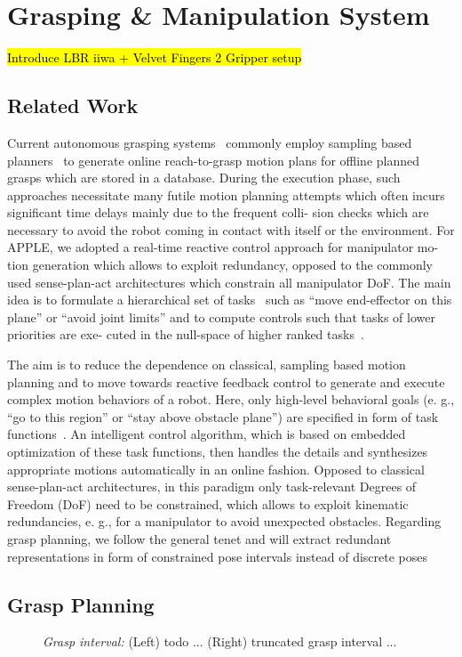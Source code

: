 \section{Grasping \& Manipulation System}
\label{sec:manip}
%
\hl{Introduce LBR iiwa + Velvet Fingers 2 Gripper setup}
%
\subsection{Related Work}
\label{subsec:Grasping_related_work}
%
 Current autonomous grasping systems~\cite{Bere07, Srin10, Krug14a}
commonly employ sampling based planners~\cite{LaVa06} to generate online reach-to-grasp motion plans
for offline planned grasps which are stored in a database. During the execution phase, such
approaches necessitate many futile motion planning attempts which often incurs significant time
delays mainly due to the frequent colli- sion checks which are necessary to avoid the robot coming
in contact with itself or the environment.  For APPLE, we adopted a real-time reactive control
approach for manipulator mo- tion generation which allows to exploit redundancy, opposed to the
commonly used sense-plan-act architectures which constrain all manipulator DoF. The main idea is to
formulate a hierarchical set of tasks~\cite{Sams91} such as “move end-effector on this plane” or
“avoid joint limits” and to compute controls such that tasks of lower priorities are exe- cuted in
the null-space of higher ranked tasks~\cite{Sici91, Sent10}.

The aim is to reduce the dependence on classical, sampling based motion planning and to move towards
reactive feedback control to generate and execute complex motion behaviors of a robot.  Here, only
high-level behavioral goals (e. g., “go to this region” or “stay above obstacle plane”) are
specified in form of task functions~\cite{Sams91}. An intelligent control algorithm, which is based
on embedded optimization of these task functions, then handles the details and synthesizes
appropriate motions automatically in an online fashion. Opposed to classical sense-plan-act
architectures, in this paradigm only task-relevant Degrees of Freedom (DoF) need to be constrained,
which allows to exploit kinematic redundancies, e. g., for a manipulator to avoid unexpected
obstacles. Regarding grasp planning, we follow the general tenet and will extract redundant
representations in form of constrained pose intervals instead of discrete poses
%
\subsection{Grasp Planning}
\begin{figure}[t!] 
   \centering
     
   \caption{\textit{Grasp interval:} (Left) todo ... (Right) truncated grasp interval ...} 
   \label{fig:grasp_interval}
\end{figure}
%

